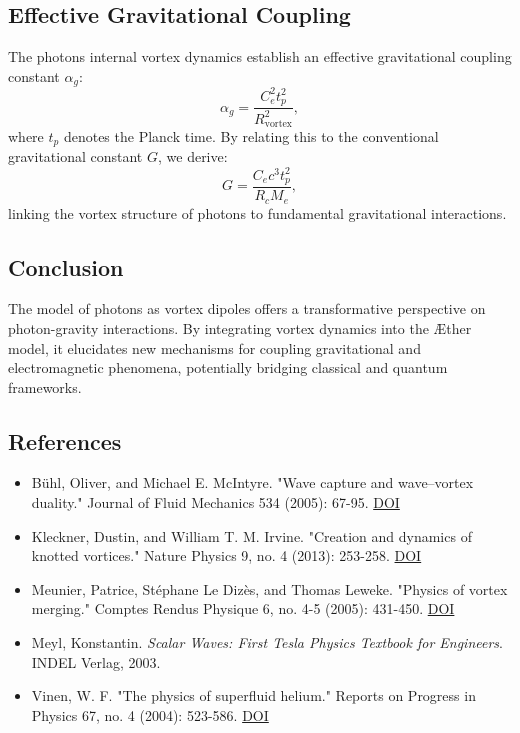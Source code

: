     \subsection*{Effective Gravitational Coupling}
    The photon\rqs s internal vortex dynamics establish an effective gravitational coupling constant $\alpha_g$:
    \begin{equation*}
        \alpha_g = \frac{C_e^2 t_p^2}{R_\text{vortex}^2},
    \end{equation*}
    where $t_p$ denotes the Planck time. By relating this to the conventional gravitational constant $G$, we derive:
    \begin{equation*}
        G = \frac{C_e c^3 t_p^2}{R_c M_e},
    \end{equation*}
    linking the vortex structure of photons to fundamental gravitational interactions.

    \subsection*{Conclusion}
    The model of photons as vortex dipoles offers a transformative perspective on photon-gravity interactions. By integrating vortex dynamics into the Æther model, it elucidates new mechanisms for coupling gravitational and electromagnetic phenomena, potentially bridging classical and quantum frameworks.

    \subsection*{References}
    \begin{itemize}
        \item Bühl, Oliver, and Michael E. McIntyre. "Wave capture and wave–vortex duality." Journal of Fluid Mechanics 534 (2005): 67-95. \href{https://doi.org/10.1017/S0022112005004374}{DOI}
        \item Kleckner, Dustin, and William T. M. Irvine. "Creation and dynamics of knotted vortices." Nature Physics 9, no. 4 (2013): 253-258. \href{https://doi.org/10.1038/nphys2560}{DOI}
        \item Meunier, Patrice, Stéphane Le Dizès, and Thomas Leweke. "Physics of vortex merging." Comptes Rendus Physique 6, no. 4-5 (2005): 431-450. \href{https://doi.org/10.1016/j.crhy.2005.06.003}{DOI}
        \item Meyl, Konstantin. \textit{Scalar Waves: First Tesla Physics Textbook for Engineers}. INDEL Verlag, 2003.
        \item Vinen, W. F. "The physics of superfluid helium." Reports on Progress in Physics 67, no. 4 (2004): 523-586. \href{https://doi.org/10.1088/0034-4885/67/4/R01}{DOI}
    \end{itemize}

